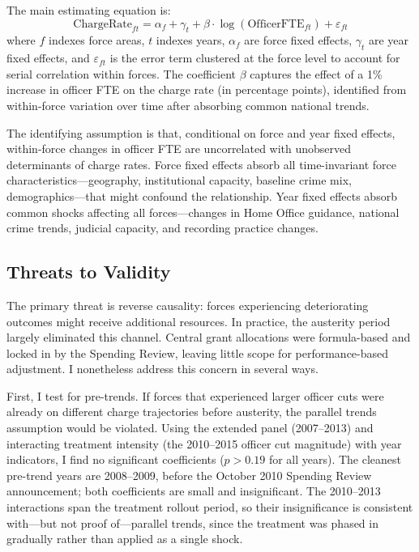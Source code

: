 \documentclass[12pt]{article}
\begin{document}
The main estimating equation is:
\begin{equation}
\text{ChargeRate}_{ft} = \alpha_f + \gamma_t + \beta \cdot \log(\text{OfficerFTE}_{ft}) + \varepsilon_{ft}
\label{eq:main}
\end{equation}
where $f$ indexes force areas, $t$ indexes years, $\alpha_f$ are force fixed effects, $\gamma_t$ are year fixed effects, and $\varepsilon_{ft}$ is the error term clustered at the force level to account for serial correlation within forces. The coefficient $\beta$ captures the effect of a 1\% increase in officer FTE on the charge rate (in percentage points), identified from within-force variation over time after absorbing common national trends.

The identifying assumption is that, conditional on force and year fixed effects, within-force changes in officer FTE are uncorrelated with unobserved determinants of charge rates. Force fixed effects absorb all time-invariant force characteristics---geography, institutional capacity, baseline crime mix, demographics---that might confound the relationship. Year fixed effects absorb common shocks affecting all forces---changes in Home Office guidance, national crime trends, judicial capacity, and recording practice changes.

\subsection{Threats to Validity}

The primary threat is reverse causality: forces experiencing deteriorating outcomes might receive additional resources. In practice, the austerity period largely eliminated this channel. Central grant allocations were formula-based and locked in by the Spending Review, leaving little scope for performance-based adjustment. I nonetheless address this concern in several ways.

First, I test for pre-trends. If forces that experienced larger officer cuts were already on different charge trajectories before austerity, the parallel trends assumption would be violated. Using the extended panel (2007--2013) and interacting treatment intensity (the 2010--2015 officer cut magnitude) with year indicators, I find no significant coefficients ($p > 0.19$ for all years). The cleanest pre-trend years are 2008--2009, before the October 2010 Spending Review announcement; both coefficients are small and insignificant. The 2010--2013 interactions span the treatment rollout period, so their insignificance is consistent with---but not proof of---parallel trends, since the treatment was phased in gradually rather than applied as a single shock.
\end{document}
